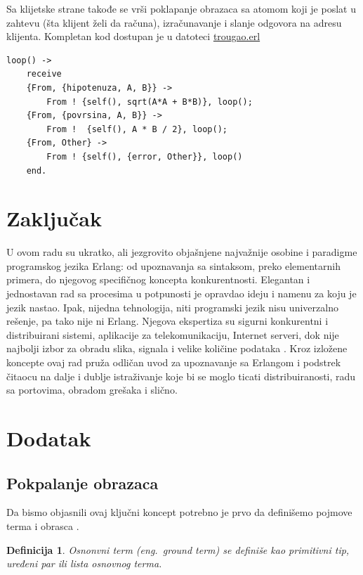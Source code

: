 \documentclass[a4paper]{article}
\newtheorem{definition}{Definicija}
\begin{document}
Sa klijetske strane takođe se vrši poklapanje obrazaca sa atomom koji je poslat u zahtevu (šta klijent želi da računa), 
izračunavanje i slanje odgovora na adresu klijenta.
Kompletan kod dostupan je u datoteci \href{https://raw.githubusercontent.com/mrdakj/msnr/master/trougao.erl}{trougao.erl}
\begin{verbatim}
loop() ->
    receive
	{From, {hipotenuza, A, B}} -> 
	    From ! {self(), sqrt(A*A + B*B)}, loop();
	{From, {povrsina, A, B}} -> 
	    From !  {self(), A * B / 2}, loop();
	{From, Other} ->
	    From ! {self(), {error, Other}}, loop()
    end.
\end{verbatim}

\section{Zaključak}
\label{sec:zakljucak}
U ovom radu su ukratko, ali jezgrovito objašnjene najvažnije osobine i paradigme programskog jezika Erlang: 
od upoznavanja sa sintaksom, preko elementarnih primera, do njegovog specifičnog koncepta konkurentnosti. 
Elegantan i jednostavan rad sa procesima u potpunosti je opravdao ideju i namenu za koju je jezik nastao.
Ipak, nijedna tehnologija, niti programski jezik nisu univerzalno rešenje, 
pa tako nije ni Erlang. Njegova ekspertiza su sigurni konkurentni i distribuirani
sistemi, aplikacije za telekomunikaciju, 
Internet serveri, dok nije najbolji izbor za obradu slika, signala i velike količine podataka \cite{sajt}. 
Kroz izložene koncepte ovaj rad pruža odličan uvod za upoznavanje sa Erlangom 
i podstrek čitaocu na dalje i dublje istraživanje koje bi se moglo ticati distribuiranosti, radu sa portovima, obradom grešaka i slično.


\appendix
 


\newpage
\appendix
\section{Dodatak}

\subsection{Pokpalanje obrazaca}
\label{sec:poklapanje_obrazaca_formalno}
Da bismo objasnili ovaj ključni koncept potrebno je prvo da definišemo pojmove terma i obrasca \cite{phdthesis}.

\theoremstyle{definition}
\begin{definition}{Osnonvni term (eng.~{\em ground term})}
se definiše kao primitivni tip, uređeni par ili lista osnovnog terma.
\end{definition}
\end{document}
